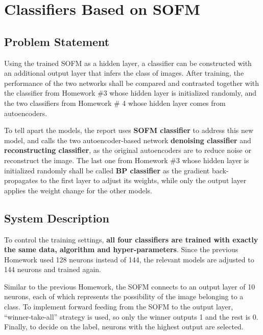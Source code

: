 \documentclass[11pt,titlepage]{article}
\begin{document}
\newpage






\section{Classifiers Based on SOFM}
\subsection{Problem Statement}

Using the trained SOFM as a hidden layer, a classifier can be constructed with an additional output layer that infers the class of images. After training, the performance of the two networks shall be compared and contrasted together with the classifier from Homework \#3 whose hidden layer is initialized randomly, and the two classifiers from Homework \# 4 whose hidden layer comes from autoencoders.

To tell apart the models, the report uses \textbf{SOFM classifier} to address this new model, and calls the two autoencoder-based network \textbf{denoising classifier} and \textbf{reconstructing classifier}, as the original autoencoders are to reduce noise or reconstruct the image. The last one from Homework \#3 whose hidden layer is initialized randomly shall be called \textbf{BP classifier} as the gradient back-propagates to the first layer to adjust its weights, while only the output layer applies the weight change for the other models.







\subsection{System Description}
To control the training settings, \textbf{all four classifiers are trained with exactly the same data, algorithm and hyper-parameters}. Since the previous Homework used 128 neurons instead of 144, the relevant models are adjusted to 144 neurons and trained again. 

Similar to the previous Homework, the SOFM connects to an output layer of 10 neurons, each of which represents the possibility of the image belonging to a class. To implement forward feeding from the SOFM to the output layer, ``winner-take-all'' strategy is used, so only the winner outputs 1 and the rest is 0. Finally, to decide on the label, neurons with the highest output are selected. 
\end{document}
